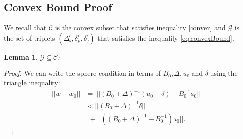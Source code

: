 \documentclass{sig-alternate-05-2015}
\newtheorem{lemma}{Lemma}
\begin{document}
\subsection{Convex Bound Proof}
We recall that $\mathcal{C}$ is the convex subset that satisfies 
inequality \ref{convex} and $\mathcal{G}$ is the set of triplets 
$(\Delta_s^i, \delta_p^i, \delta_q^i)$
 that satisfies the inequality \ref{eq:convexBound}.

\begin{lemma}
$\mathcal{G} \subseteq \mathcal{C}$:
\end{lemma}

\begin{proof}
We can write the sphere condition in terms of $B_0, \Delta, u_0$ and $\delta$ using the triangle
inequality:
\begin{equation} \label{in}
\begin{split}
||w-w_0|| & = \ ||(B_0+\Delta)^{-1}(u_0+\delta) - B_0^{-1}u_0|| \\
& < ||(B_0+\Delta)^{-1}\delta|| \\
& \ \ + ||((B_0+\Delta)^{-1} - B_0^{-1})u_0||.
\end{split}
\end{equation}


\end{proof}
\end{document}

